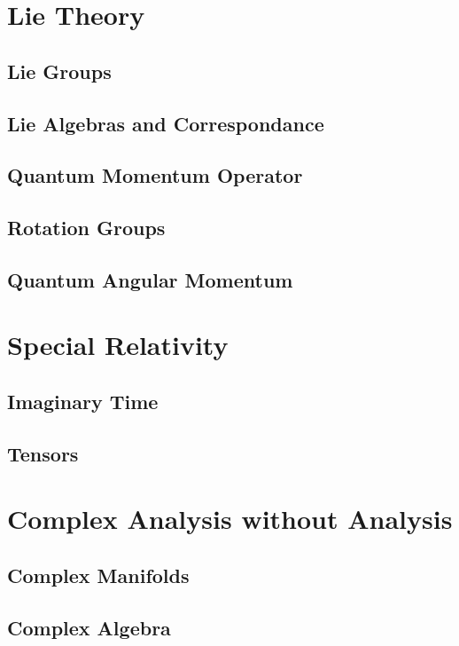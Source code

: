 \documentclass[12pt]{article}
\theoremstyle{definition}
\theoremstyle{remark}
\theoremstyle{example}
\begin{document}
\section{Lie Theory}

\subsection{Lie Groups}

\subsection{Lie Algebras and Correspondance}

\subsection{Quantum Momentum Operator}

\subsection{Rotation Groups}

\subsection{Quantum Angular Momentum}

\section{Special Relativity}

\subsection{Imaginary Time}

\subsection{Tensors}

\section{Complex Analysis without Analysis}

\subsection{Complex Manifolds}

\subsection{Complex Algebra}
\end{document}

